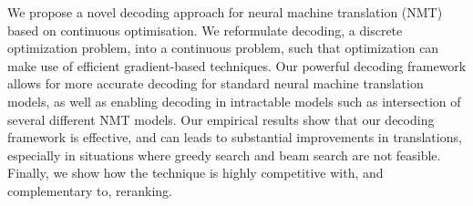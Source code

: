 We propose a novel decoding approach for neural machine translation (NMT) based on continuous optimisation. We reformulate decoding, a discrete optimization problem, into a continuous problem, such that optimization can make use of efficient gradient-based techniques. Our powerful decoding framework allows for more accurate decoding for standard neural machine translation models, as well as enabling decoding in intractable models such as intersection of several different NMT models. Our empirical results show that our decoding framework is effective, and can leads to substantial improvements in translations, especially in situations where greedy search and beam search are not feasible. Finally, we show how the technique is highly competitive with, and complementary to, reranking.
